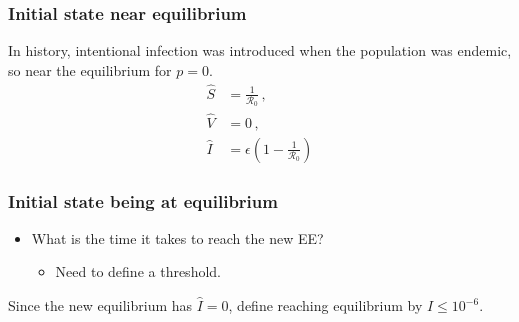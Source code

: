 \documentclass[12pt]{beamer}
\newcommand\dbyd[2]{\frac{\mathrm d{#1}}{\mathrm d{#2}}}
\newcommand{\R}{\mathcal{R}}
\newcommand{\pmV}{p_{V}}
\begin{document}
\begin{frame}
\frametitle{Initial state near equilibrium}

In history, intentional infection was introduced when the population
was endemic, so near the equilibrium for $p=0$.
\pause
\begin{subequations}
\begin{align}
\hat{S} &= \frac{1}{\R_0} \,,\\
\hat{V} &= 0\,,\\
\hat{I} &= \epsilon(1-\frac{1}{\R_0})
\end{align}
\end{subequations}
\end{frame}
\begin{frame}
\frametitle{Initial state being at equilibrium}
\begin{itemize}
\item What is the time it takes to reach the new EE?
\begin{itemize}
\item Need to define a threshold.
\end{itemize}
\end{itemize}
\pause

Since the new equilibrium has $\hat{I}=0$, define reaching equilibrium by $I\leq 10^{-6}$.
\end{frame}
\end{document}

